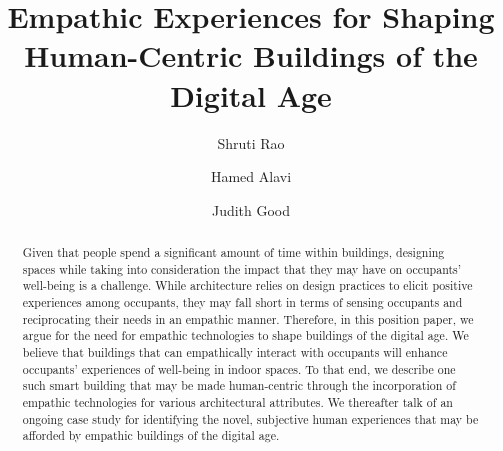 \documentclass [sigconf, review, anonymous] {acmart}
\begin{document}
\title{Empathic Experiences for Shaping Human-Centric Buildings of the Digital Age}

\author{Shruti Rao}

\author{Hamed Alavi}

\author{Judith Good}



\renewcommand{\shortauthors}{Rao et al.}

\begin{abstract}
Given that people spend a significant amount of time within buildings, designing spaces while taking into consideration the impact that they may have on occupants’ well-being is a challenge. While architecture relies on design practices to elicit positive experiences among occupants, they may fall short in terms of sensing occupants and reciprocating their needs in an empathic manner. Therefore, in this position paper, we argue for the need for empathic technologies to shape buildings of the digital age. We believe that buildings that can empathically interact with occupants will enhance occupants’ experiences of well-being in indoor spaces. To that end, we describe one such smart building that may be made human-centric through the incorporation of empathic technologies for various architectural attributes. We thereafter talk of an ongoing case study for identifying the novel, subjective human experiences that may be afforded by empathic buildings of the digital age. 
\end{abstract}
\end{document}

